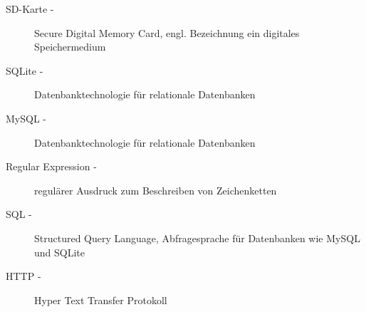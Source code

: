 \begin{description}
                \item[SD-Karte -] Secure Digital Memory Card, engl. Bezeichnung ein digitales Speichermedium
                \item[SQLite -] Datenbanktechnologie für relationale Datenbanken
                \item[MySQL -] Datenbanktechnologie für relationale Datenbanken
                \item[Regular Expression -] regulärer Ausdruck zum Beschreiben von Zeichenketten
                \item[SQL -] Structured Query Language, Abfragesprache für Datenbanken wie MySQL und SQLite
                \item[HTTP -] Hyper Text Transfer Protokoll
			\end{description}